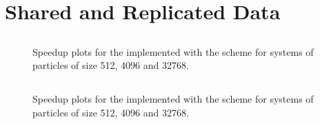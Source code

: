 \section{Shared and Replicated Data}

\subsection{\individualoperation{}}

%
%
\begin{figure}[!h]
    
    \caption{
        Speedup plots for the \individualoperation{} implemented with the \replicatedsystolicloop{} scheme for systems of particles of size 512, 4096 and 32768.
    }
    \label{fig:v1_replicated_systolic_loop_individual_operation_speedups}
\end{figure}


%
%
\begin{figure}[!h]
    
    \caption{}
    \label{fig:v1_replicated_systolic_individual_operation_512_time}
\end  {figure}

\begin{figure}[!h]
    
    \caption{}
    \label{fig:v1_replicated_systolic_individual_operation_4096_time}
\end  {figure}

\begin{figure}[!h]
    
    \caption{}
    \label{fig:v1_replicated_systolic_individual_operation_32768_time}
\end  {figure}




\subsection{\pairoperation{}}

%
%
\begin{figure}[!h]
    
    \caption{
        Speedup plots for the \pairoperation{} implemented with the \replicatedsystolicloop{} scheme for systems of particles of size 512, 4096 and 32768.
    }
    \label{fig:v1_replicated_systolic_pair_operation_speedups}
\end{figure}


